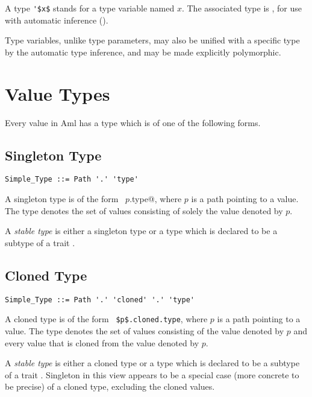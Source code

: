 A type \lstinline!'$x$! stands for a type variable named $x$. The associated type is , for use with automatic inference ().

Type variables, unlike type parameters, may also be unified with a specific type by the automatic type inference, and may be made explicitly polymorphic. 





\section{Value Types}

Every value in Aml has a type which is of one of the following forms. 






\subsection{Singleton Type}
\label{sec:singleton-types}

\syntax\begin{lstlisting}
Simple_Type ::= Path '.' 'type'
\end{lstlisting}

A singleton type is of the form ~\lstinline@$p$.type@, where $p$ is a path pointing to a value. The type denotes the set of values consisting of solely the value denoted by $p$.

A {\em stable type} is either a singleton type or a type which is declared to be a subtype of a trait . 





\subsection{Cloned Type}
\label{sec:cloned-types}

\syntax\begin{lstlisting}
Simple_Type ::= Path '.' 'cloned' '.' 'type'
\end{lstlisting}

A cloned type is of the form ~\lstinline!$p$.cloned.type!, where $p$ is a path pointing to a value. The type denotes the set of values consisting of the value denoted by $p$ and every value that is cloned from the value denoted by $p$. 

A {\em stable type} is either a cloned type or a type which is declared to be a subtype of a trait . Singleton in this view appears to be a special case (more concrete to be precise) of a cloned type, excluding the cloned values. 





